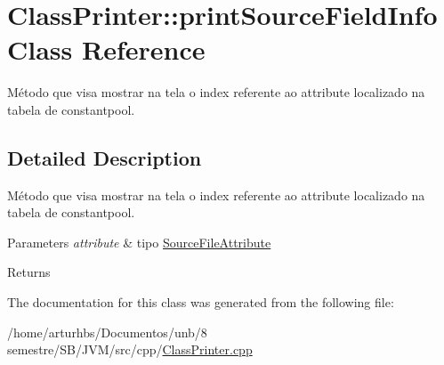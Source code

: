 \hypertarget{classClassPrinter_1_1printSourceFieldInfo}{}\section{Class\+Printer\+:\+:print\+Source\+Field\+Info Class Reference}
\label{classClassPrinter_1_1printSourceFieldInfo}


Método que visa mostrar na tela o index referente ao attribute localizado na tabela de constantpool.  




\subsection{Detailed Description}
Método que visa mostrar na tela o index referente ao attribute localizado na tabela de constantpool. 


\begin{DoxyParams}{Parameters}
{\em attribute} & tipo \hyperlink{classSourceFileAttribute}{Source\+File\+Attribute} \\
\hline
\end{DoxyParams}
\begin{DoxyReturn}{Returns}

\end{DoxyReturn}


The documentation for this class was generated from the following file\+:\begin{DoxyCompactItemize}
\item 
/home/arturhbs/\+Documentos/unb/8 semestre/\+S\+B/\+J\+V\+M/src/cpp/\hyperlink{ClassPrinter_8cpp}{Class\+Printer.\+cpp}\end{DoxyCompactItemize}
